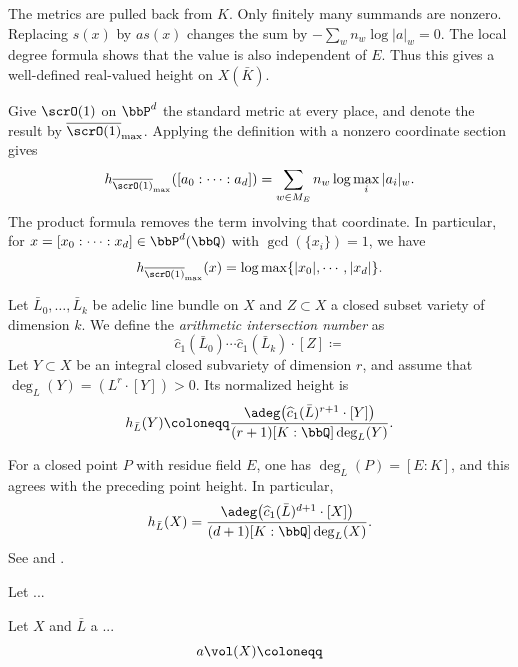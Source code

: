 \Yang{}
The metrics are pulled back from $K$.
\Yang{}
Only finitely many summands are nonzero.
Replacing $s(x)$ by $a s(x)$ changes the sum by $-\sum_w n_w\log|a|_w = 0$.
The local degree formula shows that the value is also independent of $E$.
Thus this gives a well-defined real-valued height on $X(\bar K)$.
\Yang{}

\begin{example}[label=\labelNFM{eg:standard-logarithmic-height}, status=draft, tag=0000000]
	Give $\scrO(1)$ on $\bbP^d$ the standard metric at every place, and denote the result by $\overline{\scrO(1)}_{\max}$.
	Applying the definition with a nonzero coordinate section gives
	\[ h_{\overline{\scrO(1)}_{\max}}([a_0:\cdots:a_d]) = \sum_{w \in M_E}n_w\log\max_i|a_i|_w. \]
	The product formula removes the term involving that coordinate.
	In particular, for $x = [x_0:\cdots:x_d] \in \bbP^d(\bbQ)$ with $\gcd(\{x_i\}) = 1$, we have
	\[  h_{\overline{\scrO(1)}_{\max}}(x) = \log \max\{|x_0|,\cdots,|x_d|\}. \]
\end{example}

\begin{definition}[label=\labelNFM{def:arithmetic-intersection-and-subvariety-height}, status=draft, tag=0000000]
	Let $\bar L_0,\ldots,\bar L_k$ be adelic line bundle on $X$ and $Z \subset X$ a closed subset variety of dimension $k$.
	We define the \emph{arithmetic intersection number} as
	\[ \widehat c_1(\bar L_0)\cdots\widehat c_1(\bar L_k)\cdot[Z] \coloneqq \]
	Let $Y \subset X$ be an integral closed subvariety of dimension $r$, and assume that $\deg_L(Y) = (L^r \cdot [Y]) > 0$.
	Its normalized height is
	\[ h_{\bar L}(Y) \coloneqq \frac{\adeg\bigl(\widehat c_1(\bar L)^{r+1}\cdot[Y]\bigr)}{(r+1)[K:\bbQ]\deg_L(Y)}. \]
	\Yang{}
\end{definition}

For a closed point $P$ with residue field $E$, one has $\deg_L(P) = [E:K]$, and this agrees with the preceding point height.
In particular,
\[ h_{\bar L}(X) = \frac{\adeg\bigl(\widehat c_1(\bar L)^{d+1}\cdot[X]\bigr)}{(d+1)[K:\bbQ]\deg_L(X)}. \]
See \cite[\S 3.2]{Chambert-Loir-2012-ArakelovGeometryHeights} and \cite[Appendix~A.5.3]{Yuan-Zhang-2026-AdelicLineBundles}.

\begin{theorem}[label=\labelNFM{thm:fundamental-properties-of-arithmetic-intersection}, status=draft, tag=0000000]
	Let ...
\end{theorem}

\begin{definition}[label=\labelNFM{def:arithmetic-volume-of-adelic-line-bundle}, status=draft, tag=0000000]
	Let $X$ and $\bar{L}$ a ...
	\[ a\vol(X) \coloneqq \]
\end{definition}

